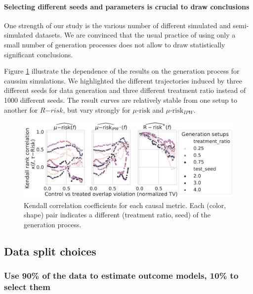 \documentclass[a4paper,num-refs]{oup-contemporary}%
\begin{document}
\paragraph{Selecting different seeds and parameters is crucial to draw
    conclusions}\label{apd:results:seed_effect}

One strength of our study is the various number of different simulated and
semi-simulated datasets. We are convinced that the usual practice of using only
a small number of generation processes does not allow to draw statistically
significant conclusions.

Figure \ref{apd:results:fig:seed_effect} illustrate the dependence of the
results on the generation process for caussim simulations. We highlighted the
different trajectories induced by three different seeds for data generation and
three different treatment ratio instead of 1000 different seeds. The result
curves are relatively stable from one setup to another for $R{-risk}$, but vary
strongly for $\mu\text{-risk}$ and $\mu\text{-risk}_{IPW}$.

\begin{figure}
    \centering
    \caption{Kendall correlation coefficients for each causal metric. Each (color,
        shape) pair indicates a different (treatment ratio, seed) of the generation
        process.}\label {apd:results:fig:seed_effect}
    \includegraphics[width=\linewidth]{caussim_seed_effect.pdf}
\end{figure}

\FloatBarrier

\subsection{Data split choices}\label{apd:results:data_split}

\subsubsection{Use 90\% of the data to estimate outcome models, 10\% to
    select them}
\end{document}

